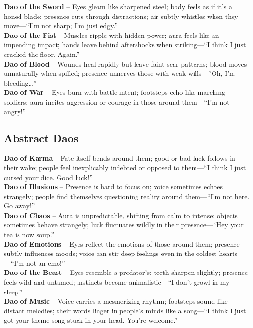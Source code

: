 \textbf{Dao of the Sword} – Eyes gleam like sharpened steel; body feels as if it’s a honed blade; presence cuts through distractions; air subtly whistles when they move—“I’m not sharp; I’m just edgy.” \\
\textbf{Dao of the Fist} – Muscles ripple with hidden power; aura feels like an impending impact; hands leave behind aftershocks when striking—“I think I just cracked the floor. Again.” \\
\textbf{Dao of Blood} – Wounds heal rapidly but leave faint scar patterns; blood moves unnaturally when spilled; presence unnerves those with weak wills—“Oh, I’m bleeding…”\\
\textbf{Dao of War} – Eyes burn with battle intent; footsteps echo like marching soldiers; aura incites aggression or courage in those around them—“I’m not angry!”



\subsection{Abstract Daos}

\textbf{Dao of Karma} – Fate itself bends around them; good or bad luck follows in their wake; people feel inexplicably indebted or opposed to them—“I think I just cursed your dice. Good luck!” \\
\textbf{Dao of Illusions} – Presence is hard to focus on; voice sometimes echoes strangely; people find themselves questioning reality around them—“I’m not here. Go away!” \\
\textbf{Dao of Chaos} – Aura is unpredictable, shifting from calm to intense; objects sometimes behave strangely; luck fluctuates wildly in their presence—“Hey your tea is now soup.” \\
\textbf{Dao of Emotions} – Eyes reflect the emotions of those around them; presence subtly influences moods; voice can stir deep feelings even in the coldest hearts—“I’m not an emo!” \\
\textbf{Dao of the Beast} – Eyes resemble a predator’s; teeth sharpen slightly; presence feels wild and untamed; instincts become animalistic—“I don’t growl in my sleep.” \\
\textbf{Dao of Music} – Voice carries a mesmerizing rhythm; footsteps sound like distant melodies; their words linger in people’s minds like a song—“I think I just got your theme song stuck in your head. You’re welcome.”


